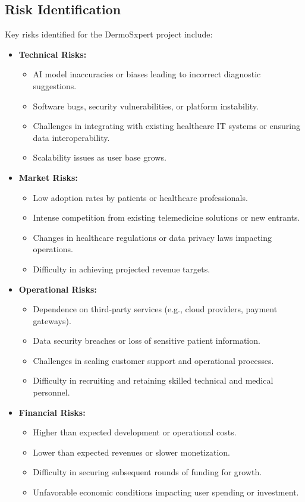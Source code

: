 \subsection{Risk Identification}
Key risks identified for the DermoSxpert project include:
\begin{itemize}
  \item \textbf{Technical Risks:}
    \begin{itemize}
        \item AI model inaccuracies or biases leading to incorrect diagnostic suggestions.
        \item Software bugs, security vulnerabilities, or platform instability.
        \item Challenges in integrating with existing healthcare IT systems or ensuring data interoperability.
        \item Scalability issues as user base grows.
    \end{itemize}
  \item \textbf{Market Risks:}
    \begin{itemize}
        \item Low adoption rates by patients or healthcare professionals.
        \item Intense competition from existing telemedicine solutions or new entrants.
        \item Changes in healthcare regulations or data privacy laws impacting operations.
        \item Difficulty in achieving projected revenue targets.
    \end{itemize}
  \item \textbf{Operational Risks:}
    \begin{itemize}
        \item Dependence on third-party services (e.g., cloud providers, payment gateways).
        \item Data security breaches or loss of sensitive patient information.
        \item Challenges in scaling customer support and operational processes.
        \item Difficulty in recruiting and retaining skilled technical and medical personnel.
    \end{itemize}
  \item \textbf{Financial Risks:}
    \begin{itemize}
        \item Higher than expected development or operational costs.
        \item Lower than expected revenues or slower monetization.
        \item Difficulty in securing subsequent rounds of funding for growth.
        \item Unfavorable economic conditions impacting user spending or investment.
    \end{itemize}
\end{itemize}

